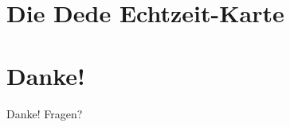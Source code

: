 \documentclass{beamer}
\begin{document}


\egroup

\section{Die Dede Echtzeit-Karte}



\bgroup








\egroup

\section*{Danke!}

\begin{frame}{Danke!}
  \center Fragen?
\end{frame}
\end{document}
